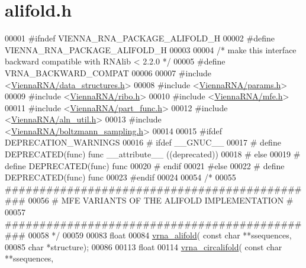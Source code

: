 \hypertarget{alifold_8h_source}{\section{alifold.\+h}
\label{alifold_8h_source}
}

\begin{DoxyCode}
00001 \textcolor{preprocessor}{#ifndef VIENNA\_RNA\_PACKAGE\_ALIFOLD\_H}
00002 \textcolor{preprocessor}{#define VIENNA\_RNA\_PACKAGE\_ALIFOLD\_H}
00003 
00004 \textcolor{comment}{/* make this interface backward compatible with RNAlib < 2.2.0 */}
00005 \textcolor{preprocessor}{#define VRNA\_BACKWARD\_COMPAT}
00006 
00007 \textcolor{preprocessor}{#include <\hyperlink{data__structures_8h}{ViennaRNA/data\_structures.h}>}
00008 \textcolor{preprocessor}{#include <\hyperlink{params_8h}{ViennaRNA/params.h}>}
00009 \textcolor{preprocessor}{#include <\hyperlink{ribo_8h}{ViennaRNA/ribo.h}>}
00010 \textcolor{preprocessor}{#include <\hyperlink{mfe_8h}{ViennaRNA/mfe.h}>}
00011 \textcolor{preprocessor}{#include <\hyperlink{part__func_8h}{ViennaRNA/part\_func.h}>}
00012 \textcolor{preprocessor}{#include <\hyperlink{aln__util_8h}{ViennaRNA/aln\_util.h}>}
00013 \textcolor{preprocessor}{#include <\hyperlink{boltzmann__sampling_8h}{ViennaRNA/boltzmann\_sampling.h}>}
00014 
00015 \textcolor{preprocessor}{#ifdef DEPRECATION\_WARNINGS}
00016 \textcolor{preprocessor}{# ifdef \_\_GNUC\_\_}
00017 \textcolor{preprocessor}{#  define DEPRECATED(func) func \_\_attribute\_\_ ((deprecated))}
00018 \textcolor{preprocessor}{# else}
00019 \textcolor{preprocessor}{#  define DEPRECATED(func) func}
00020 \textcolor{preprocessor}{# endif}
00021 \textcolor{preprocessor}{#else}
00022 \textcolor{preprocessor}{# define DEPRECATED(func) func}
00023 \textcolor{preprocessor}{#endif}
00024 
00054 \textcolor{comment}{/*}
00055 \textcolor{comment}{##############################################}
00056 \textcolor{comment}{# MFE VARIANTS OF THE ALIFOLD IMPLEMENTATION #}
00057 \textcolor{comment}{##############################################}
00058 \textcolor{comment}{*/}
00059 
00083 \textcolor{keywordtype}{float}
00084 \hyperlink{group__consensus__mfe__fold_ga02098d0c8790f9a37fbef6ad0cfc705c}{vrna\_alifold}( \textcolor{keyword}{const} \textcolor{keywordtype}{char} **ssequences,
00085               \textcolor{keywordtype}{char} *structure);
00086 
00113 \textcolor{keywordtype}{float}
00114 \hyperlink{group__consensus__mfe__fold_ga01ce2cff93ea44c4f4254760ca2bd16c}{vrna\_circalifold}( \textcolor{keyword}{const} \textcolor{keywordtype}{char} **ssequences,

\end{DoxyCode}
